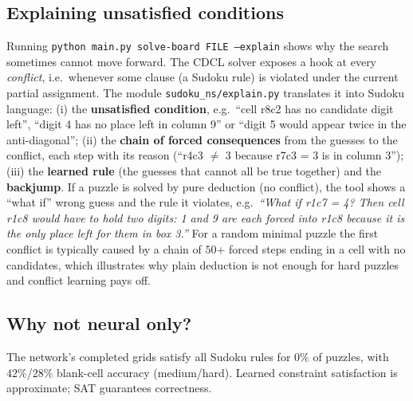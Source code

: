 \documentclass[12pt,a4paper]{article}
\begin{document}
\subsection{Explaining unsatisfied conditions}
Running \texttt{python main.py solve-board FILE --explain} shows why the search sometimes cannot move forward. The CDCL solver
exposes a hook at every \emph{conflict}, i.e.\ whenever some clause (a Sudoku rule) is violated under the current partial assignment. The module
\texttt{sudoku\_ns/explain.py} translates it into Sudoku language: (i) the \textbf{unsatisfied condition}, e.g.\ ``cell r8c2 has no candidate digit left'', ``digit 4 has no place left in column 9'' or
``digit 5 would appear twice in the anti-diagonal''; (ii) the \textbf{chain of forced consequences} from the guesses to the conflict, each step with its reason (``r4c3 $\neq$ 3 because r7c3 = 3 is in column 3'');
(iii) the \textbf{learned rule} (the guesses that cannot all be true together) and the \textbf{backjump}. If a puzzle is solved by pure deduction (no conflict), the tool shows a ``what if'' wrong guess and the rule it violates, e.g.\ \emph{``What if r1c7 = 4? Then cell r1c8 would have to hold two digits: 1 and 9 are each forced into r1c8 because it is the only place left for them in box 3.''}
For a random minimal puzzle the first conflict is typically caused by a chain of $50$+ forced steps ending in a cell with no candidates, which illustrates why plain deduction is not enough for hard puzzles and conflict learning pays off.

\subsection{Why not neural only?}
The network's completed grids satisfy all Sudoku rules for $0\%$ of puzzles, with $42\%$/$28\%$ blank-cell accuracy (medium/hard). Learned constraint satisfaction is approximate; SAT guarantees correctness.
\end{document}
